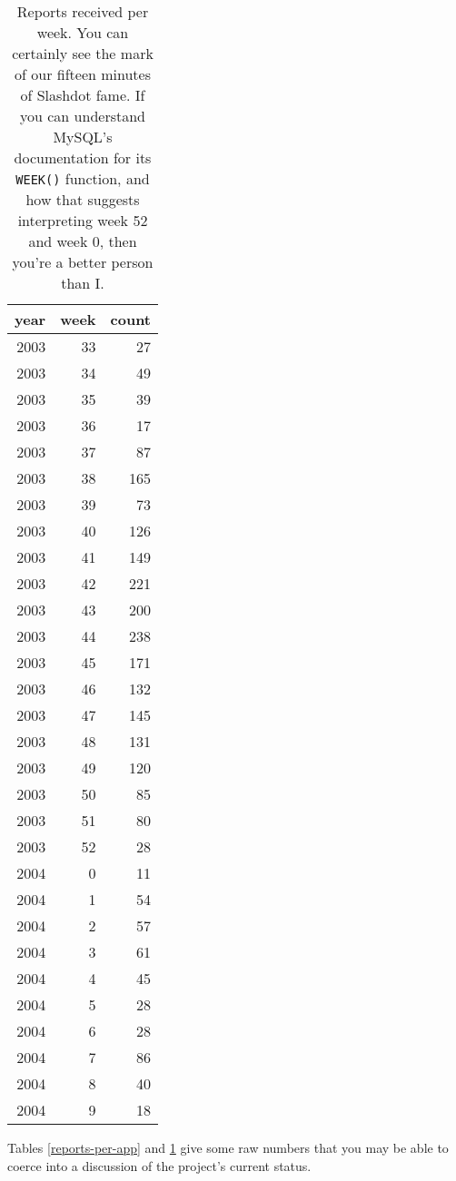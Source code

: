 \documentclass[10pt,twocolumn]{article}
\begin{document}
\begin{table}
  \centering
  \begin{tabular}{rrr}
    year & week & count \\ \hline
    2003 & 33 & 27 \\
    2003 & 34 & 49 \\
    2003 & 35 & 39 \\
    2003 & 36 & 17 \\
    2003 & 37 & 87 \\
    2003 & 38 & 165 \\
    2003 & 39 & 73 \\
    2003 & 40 & 126 \\
    2003 & 41 & 149 \\
    2003 & 42 & 221 \\
    2003 & 43 & 200 \\
    2003 & 44 & 238 \\
    2003 & 45 & 171 \\
    2003 & 46 & 132 \\
    2003 & 47 & 145 \\
    2003 & 48 & 131 \\
    2003 & 49 & 120 \\
    2003 & 50 & 85 \\
    2003 & 51 & 80 \\
    2003 & 52 & 28 \\
    2004 & 0 & 11 \\
    2004 & 1 & 54 \\
    2004 & 2 & 57 \\
    2004 & 3 & 61 \\
    2004 & 4 & 45 \\
    2004 & 5 & 28 \\
    2004 & 6 & 28 \\
    2004 & 7 & 86 \\
    2004 & 8 & 40 \\
    2004 & 9 & 18
  \end{tabular}
  \caption{Reports received per week.  You can certainly see the mark
    of our fifteen minutes of Slashdot fame.  If you can understand
    MySQL's documentation for its \texttt{WEEK()} function, and how
    that suggests interpreting week 52 and week 0, then you're a
    better person than I.}
  \label{reports-per-week}
\end{table}

Tables \ref{reports-per-app} and \ref{reports-per-week} give some raw
numbers that you may be able to coerce into a discussion of the
project's current status.
\end{document}
